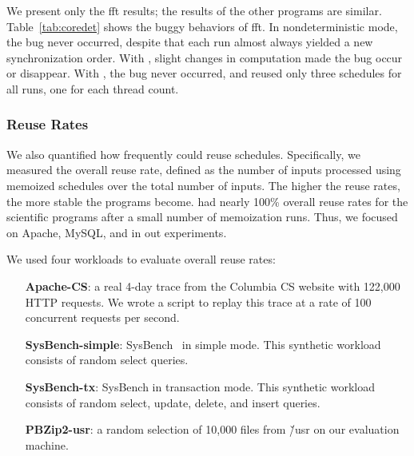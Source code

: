 We present only the fft results; the results of the other programs are
similar.  Table~\ref{tab:coredet} shows the buggy behaviors of fft.
  In nondeterministic mode, the bug never
occurred, despite that each run almost always yielded a new
synchronization order. With \coredet, slight changes in computation made the
bug occur or disappear.  With \tern, the bug never occurred, and
\tern reused only three schedules for all runs, one for each
thread count.  



\subsubsection{Reuse Rates} \label{sec:reuse-rate}

We also quantified how frequently \tern could reuse schedules.
Specifically, we measured the overall reuse rate, defined as the number of
inputs processed using memoized schedules over the total number of inputs.
The higher the reuse rates, the more stable the programs become.  \tern had
nearly 100\% overall reuse rates for the scientific programs after a small
number of memoization runs.  Thus, we focused on Apache, MySQL, and \pbzip
in out experiments.

We used four workloads to evaluate overall reuse rates:

\begin{enumerate}

\item[{\bf Apache-CS}:] a real 4-day trace from the Columbia CS website
  with 122,000 HTTP requests.  We wrote a script to replay this trace at a
  rate of 100 concurrent requests per second.

\item[{\bf SysBench-simple}:] SysBench~\cite{sysbench} in simple mode.  This
  synthetic workload consists of random select queries.


\item[{\bf SysBench-tx}:] SysBench in transaction mode.  This synthetic
  workload consists of random select, update, delete, and insert queries.

\item[{\bf PBZip2-usr}:] a random selection of 10,000 files from \v{/usr}
  on our evaluation machine.

\end{enumerate}

